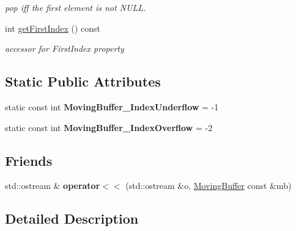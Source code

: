 \begin{DoxyCompactItemize}
\begin{DoxyCompactList}\small\item\em pop iff the first element is not NULL. \item\end{DoxyCompactList}\item 
\hypertarget{classutils_1_1MovingBuffer_a2fed5ea3406b8d3cbfc127a8df3aae7f}{
int \hyperlink{classutils_1_1MovingBuffer_a2fed5ea3406b8d3cbfc127a8df3aae7f}{getFirstIndex} () const }
\label{classutils_1_1MovingBuffer_a2fed5ea3406b8d3cbfc127a8df3aae7f}

\begin{DoxyCompactList}\small\item\em accessor for FirstIndex property \item\end{DoxyCompactList}\end{DoxyCompactItemize}
\subsection*{Static Public Attributes}
\begin{DoxyCompactItemize}
\item 
\hypertarget{classutils_1_1MovingBuffer_a9c9b030de547b19116873e00245d8759}{
static const int {\bfseries MovingBuffer\_\-IndexUnderflow} = -\/1}
\label{classutils_1_1MovingBuffer_a9c9b030de547b19116873e00245d8759}

\item 
\hypertarget{classutils_1_1MovingBuffer_aba4edd7c6f3e2ed445a6303f0869473d}{
static const int {\bfseries MovingBuffer\_\-IndexOverflow} = -\/2}
\label{classutils_1_1MovingBuffer_aba4edd7c6f3e2ed445a6303f0869473d}

\end{DoxyCompactItemize}
\subsection*{Friends}
\begin{DoxyCompactItemize}
\item 
\hypertarget{classutils_1_1MovingBuffer_a044b6dc71a4e89dd3f1d721ff77c6d62}{
std::ostream \& {\bfseries operator$<$$<$} (std::ostream \&o, \hyperlink{classutils_1_1MovingBuffer}{MovingBuffer} const \&mb)}
\label{classutils_1_1MovingBuffer_a044b6dc71a4e89dd3f1d721ff77c6d62}

\end{DoxyCompactItemize}


\subsection{Detailed Description}

